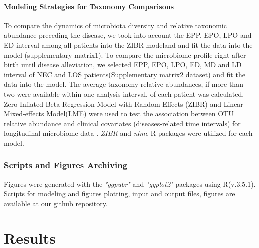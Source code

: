 \documentclass[fleqn,10pt]{wlpeerj} %
\begin{document}
      \paragraph*{Modeling Strategies for Taxonomy Comparisons}
      To compare the dynamics of microbiota diversity and relative taxonomic abundance preceding the disease, we took into account the EPP, EPO, LPO and ED interval among all patients into the ZIBR modeland  and fit the data into the model (supplementary matrix1).
      To compare the microbiome profile right after birth until disease alleviation, we selected EPP, EPO, LPO, ED, MD and LD interval of NEC and LOS patients(Supplementary matrix2 dataset) and fit the data into the model.
      The average taxonomy relative abundances, if more than two were available within one analysis interval, of each patient was calculated.
      Zero-Inflated Beta Regression Model with Random Effects (ZIBR) and Linear Mixed-effects Model(LME) were used to test the association between OTU relative abundance and clinical covariates (diseases-related time intervals) for longitudinal microbiome data \citep{chen2016two}. \textit{ZIBR} and \textit{nlme}\citep{nlme} R packages were utilized for each model.

    \subsubsection*{Scripts and Figures Archiving}
    Figures were generated with the \textit{"ggpubr"}\citep{kassambara2017ggpubr} and \textit{"ggplot2"}\citep{ggplot2} packages using R(v.3.5.1).
    Scripts for modeling and figures plotting, input and output files, figures are available at our \href{https://github.com/jiayiliujiayi/NEC-LOS-microbiota_pattern_comparison}{github repository}.



\section*{Results}
\end{document}
